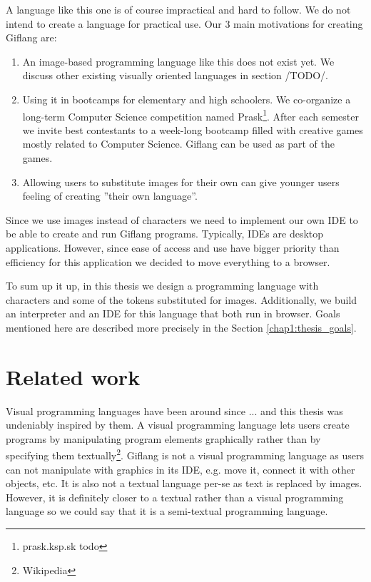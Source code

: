 A language like this one is of course impractical and hard to follow. We do not intend to create a language
for practical use. Our $3$ main motivations for creating Giflang are:
\begin{enumerate}
\item An image-based programming language like this does not exist yet. We discuss other existing visually oriented
languages in section /TODO/. 
\item Using it in bootcamps for elementary and high schoolers. We co-organize a long-term Computer Science competition
named Prask\footnote{prask.ksp.sk todo}. After each semester we invite best contestants to a week-long bootcamp
filled with creative games mostly related to Computer Science. Giflang can be used as part of the games.
\item Allowing users to substitute images for their own can give younger users feeling of creating ''their own language''.
\end{enumerate}

Since we use images instead of characters we need to implement our own IDE to be able to create and run Giflang programs. Typically,
IDEs are desktop applications. However, since ease of access and use have bigger priority than efficiency for this application
we decided to move everything to a browser.

To sum up it up, in this thesis we design a programming language with characters and some of the tokens substituted for images.
Additionally, we build an interpreter and an IDE for this language that both run in browser. Goals mentioned here are described
more precisely in the Section \ref{chap1:thesis_goals}. 

\section{Related work}
\cite{Andel07}
Visual programming languages have been around since ... and this thesis was undeniably inspired by them. A visual 
programming language lets users create programs by manipulating program elements graphically rather than by specifying them textually\footnote{Wikipedia}.
Giflang is not a visual programming language as users can not manipulate with graphics in its IDE, e.g. move it, connect it with other
objects, etc. It is also not a textual language per-se as text is replaced by images. However, it is definitely closer to a textual
rather than a visual programming language so we could say that it is a semi-textual programming language.

